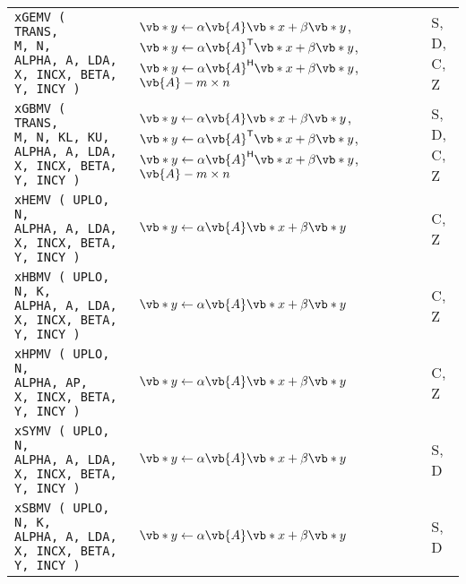 \documentclass[10pt,a3paper, landscape]{article}
\newcommand{\T}{\mathsf{T}}
\renewcommand{\H}{\mathsf{H}}
\begin{document}
\begin{tabular}{ll>{\ttfamily}l}
		\verb|xGEMV (       TRANS,       M, N,         ALPHA, A, LDA, X, INCX, BETA,  Y, INCY )        | & $\vb*{y} \gets \alpha \vb{A} \vb*{x} + \beta \vb*{y}$, $\vb*{y} \gets \alpha \vb{A}^{\T} \vb*{x} + \beta \vb*{y}$, $\vb*{y} \gets \alpha \vb{A}^{\H} \vb*{x} + \beta \vb*{y}$, $\vb{A} - m\times n$                                                          & S, D, C, Z         \\
		\verb|xGBMV (       TRANS,       M, N, KL, KU, ALPHA, A, LDA, X, INCX, BETA,  Y, INCY )        | & $\vb*{y} \gets \alpha \vb{A} \vb*{x} + \beta \vb*{y}$, $\vb*{y} \gets \alpha \vb{A}^{\T} \vb*{x} + \beta \vb*{y}$, $\vb*{y} \gets \alpha \vb{A}^{\H} \vb*{x} + \beta \vb*{y}$, $\vb{A} - m\times n$                                                          & S, D, C, Z         \\
		\verb|xHEMV ( UPLO,                 N,         ALPHA, A, LDA, X, INCX, BETA,  Y, INCY )        | & $\vb*{y} \gets \alpha \vb{A} \vb*{x} + \beta \vb*{y}$                                                                                                                                                                                                        & C, Z               \\
		\verb|xHBMV ( UPLO,                 N, K,      ALPHA, A, LDA, X, INCX, BETA,  Y, INCY )        | & $\vb*{y} \gets \alpha \vb{A} \vb*{x} + \beta \vb*{y}$                                                                                                                                                                                                        & C, Z               \\
		\verb|xHPMV ( UPLO,                 N,         ALPHA, AP,     X, INCX, BETA,  Y, INCY )        | & $\vb*{y} \gets \alpha \vb{A} \vb*{x} + \beta \vb*{y}$                                                                                                                                                                                                        & C, Z               \\
		\verb|xSYMV ( UPLO,                 N,         ALPHA, A, LDA, X, INCX, BETA,  Y, INCY )        | & $\vb*{y} \gets \alpha \vb{A} \vb*{x} + \beta \vb*{y}$                                                                                                                                                                                                        & S, D               \\
		\verb|xSBMV ( UPLO,                 N, K,      ALPHA, A, LDA, X, INCX, BETA,  Y, INCY )        | & $\vb*{y} \gets \alpha \vb{A} \vb*{x} + \beta \vb*{y}$                                                                                                                                                                                                        & S, D               \\

\end{tabular}
\end{document}
